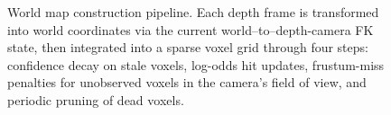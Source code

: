 \begin{figure}[H]
\centering
{}
\caption{World map construction pipeline. Each depth frame is transformed into world coordinates via the current world--to--depth-camera FK state, then integrated into a sparse voxel grid through four steps: confidence decay on stale voxels, log-odds hit updates, frustum-miss penalties for unobserved voxels in the camera's field of view, and periodic pruning of dead voxels.}
\label{fig:worldmap}
\end{figure}
